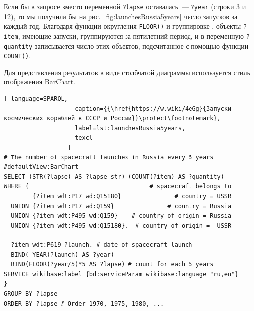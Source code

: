 Если бы в запросе вместо переменной \lstinline|?lapse| оставалась~--- \lstinline|?year| (строки 3 и 12), 
то мы получили бы на рис.~\ref{fig:launchesRussia5years} 
число запусков за каждый год. 
Благодаря функции округления \lstinline|FLOOR()|
и группировке%
, 
объекты \lstinline|?item|, имеющие запуски, группируются за пятилетний период, 
и в переменную \lstinline|?quantity| записывается число этих объектов, 
подсчитанное с помощью функции \lstinline|COUNT()|.

Для представления результатов в виде столбчатой диаграммы используется стиль отображения BarChart.

\label{question:spacecraft_1}

\begin{lstlisting}[ language=SPARQL, 
                    caption={{\href{https://w.wiki/4eGg}{Запуски космических кораблей в СССР и России}}\protect\footnotemark}, 
                    label=lst:launchesRussia5years,
                    texcl
                  ]
# The number of spacecraft launches in Russia every 5 years
#defaultView:BarChart
SELECT (STR(?lapse) AS ?lapse_str) (COUNT(?item) AS ?quantity)
WHERE {                                  # spacecraft belongs to
        {?item wdt:P17 wd:Q15180}               # country = USSR
  UNION {?item wdt:P17 wd:Q159}               # country = Russia
  UNION {?item wdt:P495 wd:Q159}    # country of origin = Russia
  UNION {?item wdt:P495 wd:Q15180}.  # country of origin =  USSR
  
  ?item wdt:P619 ?launch. # date of spacecraft launch
  BIND( YEAR(?launch) AS ?year) 
  BIND(FLOOR(?year/5)*5 AS ?lapse) # count for each 5 years
SERVICE wikibase:label {bd:serviceParam wikibase:language "ru,en"}
} 
GROUP BY ?lapse
ORDER BY ?lapse # Order 1970, 1975, 1980, ...
\end{lstlisting}

